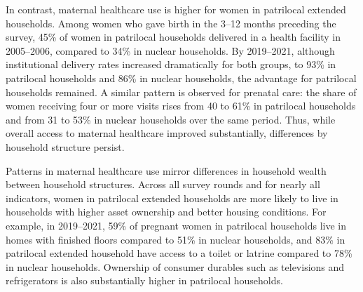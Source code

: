 \documentclass[10pt,twoside,reqno]{article}
\begin{document}
In contrast, maternal healthcare use is higher for women in patrilocal extended households. Among women who gave birth in the 3–12 months preceding the survey, 45\% of women in patrilocal households delivered in a health facility in 2005–2006, compared to 34\% in nuclear households. By 2019–2021, although institutional delivery rates increased dramatically for both groups, to 93\% in patrilocal households and 86\% in nuclear households, the advantage for patrilocal households remained. A similar pattern is observed for prenatal care: the share of women receiving four or more visits rises from 40 to 61\% in patrilocal households and from 31 to 53\% in nuclear households over the same period. Thus, while overall access to maternal healthcare improved substantially, differences by household structure persist.

Patterns in maternal healthcare use mirror differences in household wealth between household structures. Across all survey rounds and for nearly all indicators, women in patrilocal extended households are more likely to live in households with higher asset ownership and better housing conditions. For example, in 2019–2021, 59\% of pregnant women in patrilocal households live in homes with finished floors compared to 51\% in nuclear households, and 83\% in patrilocal extended household have access to a toilet or latrine compared to 78\% in nuclear households. Ownership of consumer durables such as televisions and refrigerators is also substantially higher in patrilocal households.
\end{document}
